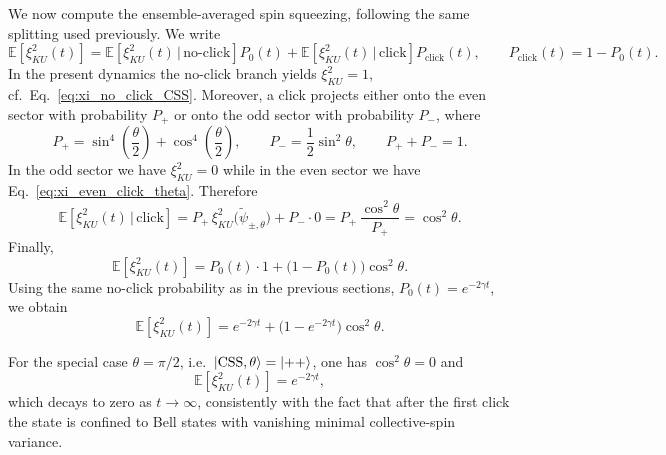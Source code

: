 We now compute the ensemble-averaged spin squeezing, following the same splitting used previously.
We write
\begin{equation}
	\mathbb{E}\!\left[\xi_{KU}^2(t)\right]
	=
	\mathbb{E}\!\left[\xi_{KU}^2(t)\,\big|\,\text{no-click}\right]P_0(t)
	+
	\mathbb{E}\!\left[\xi_{KU}^2(t)\,\big|\,\text{click}\right]P_{\mathrm{click}}(t),
	\qquad
	P_{\mathrm{click}}(t)=1-P_0(t).
\end{equation}
In the present dynamics the no-click branch yields $\xi_{KU}^2=1$, cf.\ Eq.~\eqref{eq:xi_no_click_CSS}.
Moreover, a click projects either onto the even sector with probability $P_+$ or onto the odd sector with
probability $P_-$, where
\begin{equation}
	P_+=\sin^{4}\!\left(\frac{\theta}{2}\right)+\cos^{4}\!\left(\frac{\theta}{2}\right),
	\qquad
	P_-=\frac{1}{2}\sin^{2}\theta,
	\qquad
	P_++P_-=1.
\end{equation}
In the odd sector we have $\xi_{KU}^2=0$ while in the even sector we have Eq.~\eqref{eq:xi_even_click_theta}.
Therefore
\begin{equation}
	\mathbb{E}\!\left[\xi_{KU}^2(t)\,\big|\,\text{click}\right]
	=
	P_+\,
	\xi_{KU}^2\big(\tilde{\psi}_{\pm,\theta}\big)
	+
	P_- \cdot 0
	=
	P_+\,
	\frac{\cos^{2}\theta}{P_+}
	=
	\cos^{2}\theta.
\end{equation}
Finally,
\begin{equation}
	\boxed{
		\mathbb{E}\!\left[\xi_{KU}^2(t)\right]
		=
		P_0(t)\cdot 1
		+
		\big(1-P_0(t)\big)\cos^{2}\theta.}
	\label{eq:xi_ensemble_avg_general}
\end{equation}
Using the same no-click probability as in the previous sections, $P_0(t)=e^{-2\gamma t}$,
we obtain
\begin{equation}
	\boxed{
		\mathbb{E}\!\left[\xi_{KU}^2(t)\right]
		=
		e^{-2\gamma t}
		+
		\big(1-e^{-2\gamma t}\big)\cos^{2}\theta.}
	\label{eq:xi_ensemble_avg_explicit}
\end{equation}

For the special case $\theta=\pi/2$, i.e.\ $\ket{\mathrm{CSS},\theta}=\ket{++}$, one has $\cos^{2}\theta=0$ and
\begin{equation}
	\mathbb{E}\!\left[\xi_{KU}^2(t)\right]
	=
	e^{-2\gamma t},
\end{equation}
which decays to zero as $t\to\infty$, consistently with the fact that after the first click the state is
confined to Bell states with vanishing minimal collective-spin variance.

